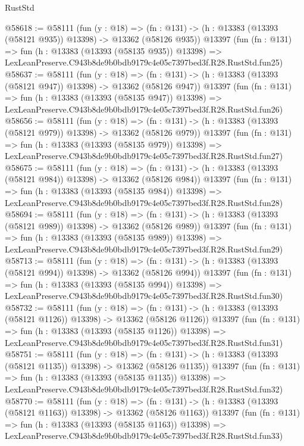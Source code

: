 \begin{lexlean}{RustStd}
\begin{coremodule}
@58618 := @58111
    (fun (y : @18) =>
    (fn : @131) -> (h : @13383 (@13393 (@58121 @935)) @13398) -> @13362 (@58126 @935))
    @13397
    (fun (fn : @131) =>
    fun (h : @13383 (@13393 (@58135 @935)) @13398) =>
    LexLeanPreserve.C943b8de9b0bdb9179c4e05c7397bed3f.R28.RustStd.fun25)
@58637 := @58111
    (fun (y : @18) =>
    (fn : @131) -> (h : @13383 (@13393 (@58121 @947)) @13398) -> @13362 (@58126 @947))
    @13397
    (fun (fn : @131) =>
    fun (h : @13383 (@13393 (@58135 @947)) @13398) =>
    LexLeanPreserve.C943b8de9b0bdb9179c4e05c7397bed3f.R28.RustStd.fun26)
@58656 := @58111
    (fun (y : @18) =>
    (fn : @131) -> (h : @13383 (@13393 (@58121 @979)) @13398) -> @13362 (@58126 @979))
    @13397
    (fun (fn : @131) =>
    fun (h : @13383 (@13393 (@58135 @979)) @13398) =>
    LexLeanPreserve.C943b8de9b0bdb9179c4e05c7397bed3f.R28.RustStd.fun27)
@58675 := @58111
    (fun (y : @18) =>
    (fn : @131) -> (h : @13383 (@13393 (@58121 @984)) @13398) -> @13362 (@58126 @984))
    @13397
    (fun (fn : @131) =>
    fun (h : @13383 (@13393 (@58135 @984)) @13398) =>
    LexLeanPreserve.C943b8de9b0bdb9179c4e05c7397bed3f.R28.RustStd.fun28)
@58694 := @58111
    (fun (y : @18) =>
    (fn : @131) -> (h : @13383 (@13393 (@58121 @989)) @13398) -> @13362 (@58126 @989))
    @13397
    (fun (fn : @131) =>
    fun (h : @13383 (@13393 (@58135 @989)) @13398) =>
    LexLeanPreserve.C943b8de9b0bdb9179c4e05c7397bed3f.R28.RustStd.fun29)
@58713 := @58111
    (fun (y : @18) =>
    (fn : @131) -> (h : @13383 (@13393 (@58121 @994)) @13398) -> @13362 (@58126 @994))
    @13397
    (fun (fn : @131) =>
    fun (h : @13383 (@13393 (@58135 @994)) @13398) =>
    LexLeanPreserve.C943b8de9b0bdb9179c4e05c7397bed3f.R28.RustStd.fun30)
@58732 := @58111
    (fun (y : @18) =>
    (fn : @131) -> (h : @13383 (@13393 (@58121 @1126)) @13398) -> @13362 (@58126 @1126))
    @13397
    (fun (fn : @131) =>
    fun (h : @13383 (@13393 (@58135 @1126)) @13398) =>
    LexLeanPreserve.C943b8de9b0bdb9179c4e05c7397bed3f.R28.RustStd.fun31)
@58751 := @58111
    (fun (y : @18) =>
    (fn : @131) -> (h : @13383 (@13393 (@58121 @1135)) @13398) -> @13362 (@58126 @1135))
    @13397
    (fun (fn : @131) =>
    fun (h : @13383 (@13393 (@58135 @1135)) @13398) =>
    LexLeanPreserve.C943b8de9b0bdb9179c4e05c7397bed3f.R28.RustStd.fun32)
@58770 := @58111
    (fun (y : @18) =>
    (fn : @131) -> (h : @13383 (@13393 (@58121 @1163)) @13398) -> @13362 (@58126 @1163))
    @13397
    (fun (fn : @131) =>
    fun (h : @13383 (@13393 (@58135 @1163)) @13398) =>
    LexLeanPreserve.C943b8de9b0bdb9179c4e05c7397bed3f.R28.RustStd.fun33)

\end{coremodule}
\end{lexlean}
